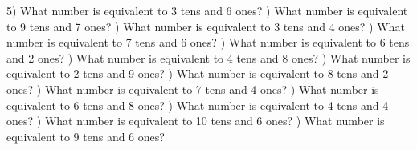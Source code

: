 \documentclass{article}%
\begin{document}
5) What number is equivalent to 3 tens and 6 ones?%
\newline%
\newline%
) What number is equivalent to 9 tens and 7 ones?%
\newline%
\newline%
) What number is equivalent to 3 tens and 4 ones?%
\newline%
\newline%
) What number is equivalent to 7 tens and 6 ones?%
\newline%
\newline%
) What number is equivalent to 6 tens and 2 ones?%
\newline%
\newline%
) What number is equivalent to 4 tens and 8 ones?%
\newline%
\newline%
) What number is equivalent to 2 tens and 9 ones?%
\newline%
\newline%
) What number is equivalent to 8 tens and 2 ones?%
\newline%
\newline%
) What number is equivalent to 7 tens and 4 ones?%
\newline%
\newline%
) What number is equivalent to 6 tens and 8 ones?%
\newline%
\newline%
) What number is equivalent to 4 tens and 4 ones?%
\newline%
\newline%
) What number is equivalent to 10 tens and 6 ones?%
\newline%
\newline%
) What number is equivalent to 9 tens and 6 ones?%
\newline%
\newline%
\newline%
\end{document}
